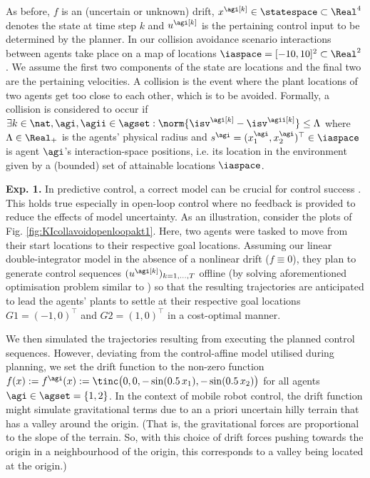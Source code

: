 As before, $f$ is an (uncertain or unknown) drift, $x^\agi[k] \in \statespace \subset \Real^4$ denotes the state at time step $k$ and $u^\agi[k]$ is the pertaining control input to be determined by the planner. In our collision avoidance scenario interactions between agents take place on a map of locations $\iaspace = [-10,10]^2 \subset \Real^2$. We assume the first two components of the state are locations and the final two are the pertaining velocities.
A collision is the event where the plant locations of two agents get too close to each other, which is to be avoided. Formally, a collision is considered to occur if $\exists k \in \nat, \agi, \agii \in \agset: \norm{\isv^\agi[k] - \isv^\agii[k]} \leq \Lambda$ where $\Lambda \in \Real_+$ is the agents' physical radius and $s^\agi = (x_1^\agi,x_2^\agi)^\top \in \iaspace$ is agent $\agi$'s interaction-space positions, i.e. its location in the environment given by a (bounded) set of attainable locations $\iaspace$.
 
\textbf{Exp. 1.}
In predictive control, a correct model can be crucial for control success \cite{Jmacmpcbook2002}. This holds true especially in open-loop control where no feedback is provided to reduce the effects of model uncertainty. As an illustration, consider the plots of Fig. \ref{fig:KIcollavoidopenloopakt1}. Here, two agents were tasked to move from their start locations to their respective goal locations. Assuming our linear double-integrator model in the absence of a nonlinear drift ($f \equiv 0$), they plan 
to generate control sequences $( u^\agi[k])_{k=1,...,T}$ offline (by solving aforementioned optimisation problem similar to \cite{Lyons2011}) so that the resulting trajectories are anticipated to lead the agents' plants to settle at their respective goal locations $G1 = (-1,0)^\top$ and $G2 = (1,0)^\top$ in a cost-optimal manner. 

We then simulated the trajectories resulting from executing the planned control sequences. However, deviating from the control-affine model utilised during planning, we set the drift function to the non-zero function $f(x) := f^\agi(x) := \tinc \bigl(0,0, - \sin(0.5\, x_1), - \sin(0.5 \, x_2) \bigr)$ for all agents $\agi \in \agset =\{1,2\}$.  In the context of mobile robot control, the drift function might simulate gravitational terms due to an a priori uncertain hilly terrain that has a valley around the origin. (That is, the gravitational forces are proportional to the slope of the terrain. So, with this choice of drift forces pushing towards the origin in a neighbourhood of the origin, this corresponds to a valley being located at the origin.) 

